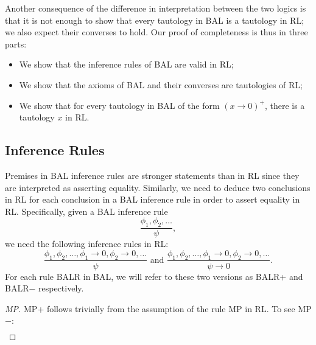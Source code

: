 \documentclass[preprint,leqno]{elsarticle}
\begin{document}
Another consequence of the difference in interpretation between the
two logics is that it is not enough to show that every tautology in
BAL is a tautology in RL; we also expect their converses to hold. Our
proof of completeness is thus in three parts:
\begin{itemize}
  \item We show that the inference rules of BAL are valid in RL;
  \item We show that the axioms of BAL and their converses are
    tautologies of RL;
  \item We show that for every tautology in BAL of the form
    $(x\rightarrow 0)^+$, there is a tautology $x$ in RL.
\end{itemize}

\subsection{Inference Rules}

Premises in BAL inference rules are stronger statements than in RL
since they are interpreted as asserting equality. Similarly, we need
to deduce two conclusions in RL for each conclusion in a BAL inference
rule in order to assert equality in RL. Specifically, given a BAL
inference rule
$$\frac{\phi_1,\phi_2,\ldots}{\psi},$$
we need the following inference rules in RL:
$$\frac{\phi_1,\phi_2,\ldots, \phi_1\rightarrow 0, \phi_2\rightarrow
  0, \ldots}{\psi}\text{ and }\frac{\phi_1,\phi_2,\ldots,
  \phi_1\rightarrow 0, \phi_2\rightarrow 0, \ldots}{\psi \rightarrow
  0}.$$
For each rule BALR in BAL, we will refer to these two versions as
BALR+ and BALR$-$ respectively.

\begin{proof}[MP]
MP+ follows trivially from the assumption of the rule MP in RL. To see MP$-$:
\begin{align}

\end{align}
\end{proof}

\end{document}
